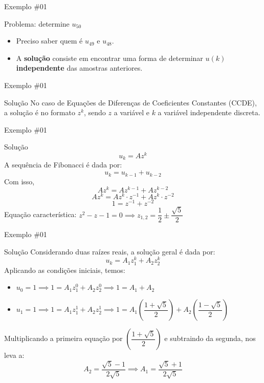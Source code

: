 \begin{frame}{Exemplo \#01}
\begin{block}{Problema: determine $u_{50}$}
\begin{itemize}
    \item Preciso saber quem é $u_{49}$ e $u_{48}$.
    \item A \textbf{solução} consiste em encontrar uma forma de determinar $u(k)$ \textbf{independente} das amostras anteriores.
\end{itemize}
\end{block}
\end{frame}

\begin{frame}{Exemplo \#01}
\begin{block}{Solução}
No caso de Equações de Diferenças de Coeficientes Constantes (CCDE), a solução é no formato $z^k$, sendo $z$ a variável e $k$ a variável independente discreta.
\end{block}
\end{frame}

\begin{frame}{Exemplo \#01}
\begin{block}{Solução}
$$\boxed{u_k = Az^k}$$
A sequência de Fibonacci é dada por:
$$u_k = u_{k-1} + u_{k-2}$$
Com isso,
$$Az^k = Az^{k-1} + Az^{k-2}$$
$$Az^k = Az^k \cdot z^{-1} + Az^k \cdot z^{-2}$$
$$1 = z^{-1} + z^{-2}$$
Equação característica: $z^2 - z - 1 = 0 \implies z_{1,2} = \dfrac{1}{2} \pm \dfrac{\sqrt{5}}{2}$
\end{block}
\end{frame}

\begin{frame}{Exemplo \#01}
\begin{block}{Solução}
Considerando duas raízes reais, a solução geral é dada por:
$$u_k = A_1z_1^{k} + A_2z_2^{k}$$
Aplicando as condições iniciais, temos:
\begin{itemize}
    \item $u_0 = 1 \implies 1 = A_1z_1^{0} + A_2z_2^{0} \implies 1 = A_1 + A_2$
    \item $u_1 = 1 \implies 1 = A_1z_1^{1} + A_2z_2^{1} \implies 1 = A_1\left(\dfrac{1 + \sqrt{5}}{2}\right) + A_2\left(\dfrac{1 - \sqrt{5}}{2}\right)$
\end{itemize}
Multiplicando a primeira equação por $\left(\dfrac{1 + \sqrt{5}}{2}\right)$ e subtraindo da segunda, nos leva a:
$$A_2 = \dfrac{\sqrt{5} - 1}{2\sqrt{5}} \implies A_1 = \dfrac{\sqrt{5} + 1}{2\sqrt{5}}$$
\end{block}
\end{frame}

